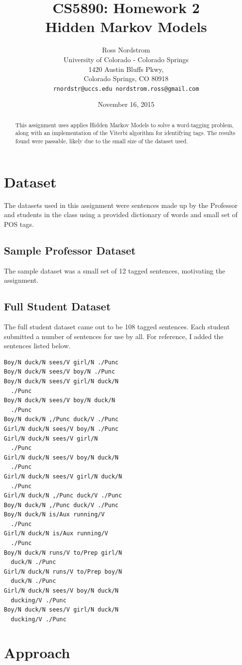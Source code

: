 \documentclass[11pt]{article}
\title{CS5890: Homework 2 \\ Hidden Markov Models}
\author{Ross Nordstrom \\
  University of Colorado - Colorado Springs \\
  1420 Austin Bluffs Pkwy, \\
  Colorado Springs, CO 80918 \\
  {\tt rnordstr@uccs.edu nordstrom.ross@gmail.com} \\}
\date{November 16, 2015}
\begin{document}
\maketitle
\begin{abstract}
This assignment uses applies Hidden Markov Models to solve a word-tagging problem, along with an implementation
of the Viterbi algorithm for identifying tags. The results found were passable, likely due to the small size of the
dataset used.
\end{abstract}

\section{Dataset}
The datasets used in this assignment were sentences made up by the Professor and students in the class using a
provided dictionary of words and small set of POS tags.

\subsection{Sample Professor Dataset}
The sample dataset was a small set of 12 tagged sentences, motivating the assignment.

\subsection{Full Student Dataset}
The full student dataset came out to be 108 tagged sentences. Each student submitted a number of sentences for use by
all. For reference, I added the sentences listed below.

\begin{lstlisting}
Boy/N duck/N sees/V girl/N ./Punc
Boy/N duck/N sees/V boy/N ./Punc
Boy/N duck/N sees/V girl/N duck/N
  ./Punc
Boy/N duck/N sees/V boy/N duck/N
  ./Punc
Boy/N duck/N ,/Punc duck/V ./Punc
Girl/N duck/N sees/V boy/N ./Punc
Girl/N duck/N sees/V girl/N
  ./Punc
Girl/N duck/N sees/V boy/N duck/N
  ./Punc
Girl/N duck/N sees/V girl/N duck/N
  ./Punc
Girl/N duck/N ,/Punc duck/V ./Punc
Boy/N duck/N ,/Punc duck/V ./Punc
Boy/N duck/N is/Aux running/V
  ./Punc
Girl/N duck/N is/Aux running/V
  ./Punc
Boy/N duck/N runs/V to/Prep girl/N
  duck/N ./Punc
Girl/N duck/N runs/V to/Prep boy/N
  duck/N ./Punc
Girl/N duck/N sees/V boy/N duck/N
  ducking/V ./Punc
Boy/N duck/N sees/V girl/N duck/N
  ducking/V ./Punc
\end{lstlisting}

\section{Approach}
\end{document}
